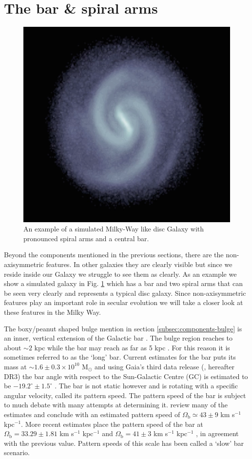 \section{The bar \& spiral arms}\label{sec:barspirals}
\begin{figure}[t]
    \centering
    \includegraphics[width=.65\textwidth]{images/simgal.png}
    \caption{An example of a simulated Milky-Way like disc Galaxy with pronounced spiral arms and a central bar.} %
    \label{fig:simgal}
\end{figure}
Beyond the components mentioned in the previous sections, there are the non-axisymmetric features. In other galaxies they are clearly visible but since we reside inside our Galaxy we struggle to see them as clearly. As an example we show a simulated galaxy in Fig. \ref{fig:simgal} which has a bar and two spiral arms that can be seen very clearly and represents a typical disc galaxy. Since non-axisymmetric features play an important role in secular evolution we will take a closer look at these features in the Milky Way.

The boxy/peanut shaped bulge mention in section \ref{subsec:components-bulge} is an inner, vertical extension of the Galactic bar \citep{bland-hawthorn:16}. The bulge region reaches to about ${\sim}2$ kpc \citep{wegg:13} while the bar may reach as far as 5 kpc \citep{wegg:15}. For this reason it is sometimes referred to as the `long' bar. Current estimates for the bar puts its mass at ${\sim}1.6\pm 0.3 \times 10^{10}$ M$_\odot$ \citep{kipper:20} and using Gaia's third data release (\citealt{dr3}, hereafter DR3) the bar angle with respect to the Sun-Galactic Centre (GC) is estimated to be $-19.2^\circ \pm 1.5^\circ$ \citep{dr3:asymmetries}. The bar is not static however and is rotating with a specific angular velocity, called its pattern speed. The pattern speed of the bar is subject to much debate with many attempts at determining it. \cite{bland-hawthorn:16} review many of the estimates and conclude with an estimated pattern speed of $\Omega_\mathrm{b} \simeq 43 \pm 9$ km s$^{-1}$ kpc$^{-1}$. More recent estimates place the pattern speed of the bar at $\Omega_\mathrm{b} = 33.29 \pm 1.81$ km s$^{-1}$ kpc$^{-1}$ \citep{clarke:22} and $\Omega_\mathrm{b} = 41 \pm 3$ km s$^{-1}$ kpc$^{-1}$ \citep{bovy:19, sanders:19}, in agreement with the previous value. Pattern speeds of this scale has been called a `slow' bar scenario.

